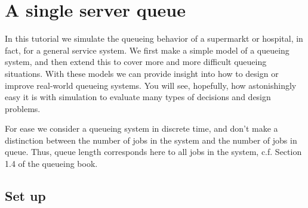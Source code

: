 \documentclass{scrartcl}
\begin{document}




\clearpage


\section{A single server queue}
\label{sec:single-server-queue}

In this tutorial we simulate the queueing behavior of a supermarkt or hospital, in fact, for a general service system. We first make a simple model of a queueing system, and then extend this to cover more and more difficult queueing situations. With these models we can provide insight into how to design or improve real-world queueing systems.  You will see, hopefully, how astonishingly easy it is with simulation to evaluate many types of decisions and design problems.  

For ease we  consider a queueing system in discrete time, and don't make a distinction between the number of jobs in the system and the number of jobs in queue. Thus, queue length corresponds here to all jobs in the system, c.f. Section 1.4 of the queueing book. 

\subsection{Set up}
\label{sec:set-up}
\end{document}
